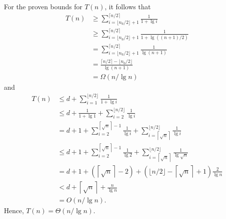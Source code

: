 For the proven bounds for $T(n)$, it follows that
\begin{align*}
    T(n) &\ge \sum_{i=\lfloor n_0/2\rfloor+1}^{\lceil n/2\rceil}\frac{1}{1+\lg i} \\[1mm]
    &\ge \sum_{i=\lfloor n_0/2\rfloor+1}^{\lceil n/2\rceil}\frac{1}{1+\lg((n+1)/2)} \\[1mm]
    &= \sum_{i=\lfloor n_0/2\rfloor+1}^{\lceil n/2\rceil}\frac{1}{\lg(n+1)} \\[1mm]
    &= \frac{\lceil n/2\rceil-\lfloor n_0/2\rfloor}{\lg(n+1)} \\
    &= \Omega(n/\lg n)
\end{align*}
and
\begin{align*}
    T(n) &\le d+\sum_{i=1}^{\lfloor n/2\rfloor}\frac{1}{1+\lg i} \\
    &\le d+\frac{1}{1+\lg1}+\sum_{i=2}^{\lfloor n/2\rfloor}\frac{1}{\lg i} \\
    &= d+1+\sum_{i=2}^{\left\lceil\sqrt{n}\right\rceil-1}\frac{1}{\lg i}+\sum_{i=\left\lceil\sqrt{n}\right\rceil}^{\lfloor n/2\rfloor}\frac{1}{\lg i} \\
    &\le d+1+\sum_{i=2}^{\left\lceil\sqrt{n}\right\rceil-1}\frac{1}{\lg2}+\sum_{i=\left\lceil\sqrt{n}\right\rceil}^{\lfloor n/2\rfloor}\frac{1}{\lg\sqrt{n}} \\
    &= d+1+\left(\left\lceil\sqrt{n}\right\rceil-2\right)+\left(\lfloor n/2\rfloor-\left\lceil\sqrt{n}\right\rceil+1\right)\frac{2}{\lg n} \\
    &< d+\left\lceil\sqrt{n}\right\rceil+\frac{n}{\lg n} \\
    &= O(n/\lg n).
\end{align*}
Hence, $T(n)=\Theta(n/\lg n)$.

